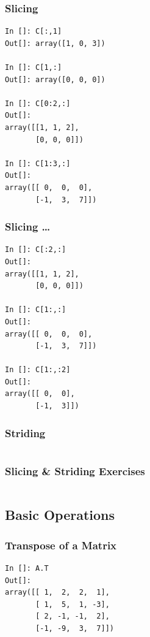 \documentclass[14pt,compress]{beamer}
\begin{document}
\begin{frame}[fragile]
  \frametitle{Slicing}
\begin{small}
  \begin{lstlisting}
In []: C[:,1]
Out[]: array([1, 0, 3])

In []: C[1,:]
Out[]: array([0, 0, 0])

In []: C[0:2,:]
Out[]: 
array([[1, 1, 2],
       [0, 0, 0]])

In []: C[1:3,:]
Out[]: 
array([[ 0,  0,  0],
       [-1,  3,  7]])
  \end{lstlisting}
\end{small}
\end{frame}

\begin{frame}[fragile]
  \frametitle{Slicing \ldots}
\begin{small}
  \begin{lstlisting}
In []: C[:2,:]
Out[]: 
array([[1, 1, 2],
       [0, 0, 0]])

In []: C[1:,:]
Out[]: 
array([[ 0,  0,  0],
       [-1,  3,  7]])

In []: C[1:,:2]
Out[]: 
array([[ 0,  0],
       [-1,  3]])
  \end{lstlisting}

\end{small}
\end{frame}

\begin{frame}[fragile]
  \frametitle{Striding}
  \begin{lstlisting}
  \end{lstlisting}
\end{frame}

\begin{frame}[fragile]
  \frametitle{Slicing \& Striding Exercises}
  \begin{lstlisting}
  \end{lstlisting}
\end{frame}

\subsection{Basic Operations}

\begin{frame}[fragile]
\frametitle{Transpose of a Matrix}
\begin{lstlisting}
In []: A.T
Out[]:
array([[ 1,  2,  2,  1],
       [ 1,  5,  1, -3],
       [ 2, -1, -1,  2],
       [-1, -9,  3,  7]])
\end{lstlisting}
\end{frame}
\end{document}
